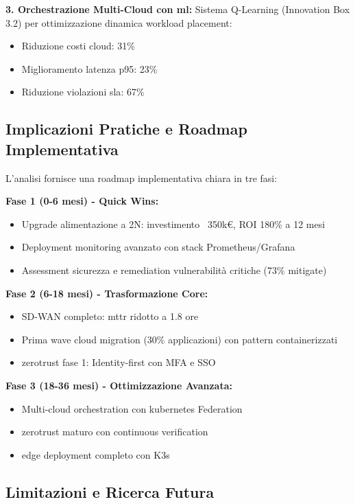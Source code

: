 \textbf{3. Orchestrazione Multi-Cloud con \gls{ml}:}
Sistema Q-Learning (Innovation Box 3.2) per ottimizzazione dinamica workload placement:
\begin{itemize}
    \item Riduzione costi cloud: 31\%
    \item Miglioramento latenza p95: 23\%
    \item Riduzione violazioni \gls{sla}: 67\%
\end{itemize}

\subsection{\texorpdfstring{Implicazioni Pratiche e Roadmap Implementativa}{3.8.5 - Implicazioni Pratiche e Roadmap Implementativa}}

L'analisi fornisce una roadmap implementativa chiara in tre fasi:

\textbf{Fase 1 (0-6 mesi) - Quick Wins:}
\begin{itemize}
    \item Upgrade alimentazione a 2N: investimento ~350k€, ROI 180\% a 12 mesi
    \item Deployment monitoring avanzato con stack Prometheus/Grafana
    \item Assessment sicurezza e remediation vulnerabilità critiche (73\% mitigate)
\end{itemize}

\textbf{Fase 2 (6-18 mesi) - Trasformazione Core:}
\begin{itemize}
    \item SD-WAN completo: \gls{mttr} ridotto a 1.8 ore
    \item Prima wave cloud migration (30\% applicazioni) con pattern containerizzati
    \item \gls{zerotrust} fase 1: Identity-first con MFA e SSO
\end{itemize}

\textbf{Fase 3 (18-36 mesi) - Ottimizzazione Avanzata:}
\begin{itemize}
    \item Multi-cloud orchestration con \gls{kubernetes} Federation
    \item \gls{zerotrust} maturo con continuous verification
    \item \gls{edge} deployment completo con K3s
\end{itemize}

\subsection{\texorpdfstring{Limitazioni e Ricerca Futura}{3.8.6 - Limitazioni e Ricerca Futura}}

